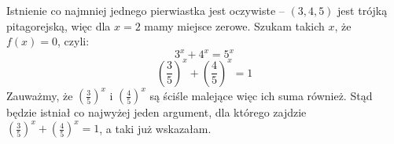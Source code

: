 \documentclass{report}
\begin{document}
\newpage
Istnienie co najmniej jednego pierwiastka jest oczywiste -- $(3, 4, 5)$
jest trójką pitagorejską, więc dla $x=2$ mamy miejsce zerowe.
Szukam takich $x$, że $f(x) = 0$, czyli:
$$ 3^x + 4^x = 5^x $$
$$ (\frac{3}{5})^x + (\frac{4}{5})^x  = 1 $$
\noindent Zauważmy, że $(\frac{3}{5})^x$ i $(\frac{4}{5})^x$ są ściśle malejące
więc ich suma również. Stąd będzie istniał co najwyżej jeden argument, dla 
którego zajdzie $ (\frac{3}{5})^x + (\frac{4}{5})^x  = 1 $, a taki już wskazałam.
\end{document}
